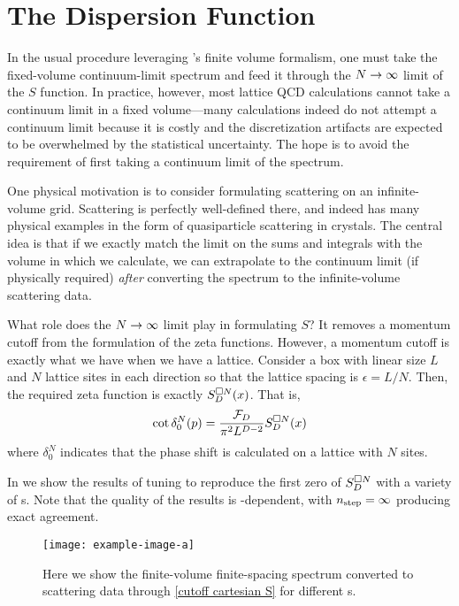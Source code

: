 \section{The Dispersion Function}\label{sec:dispersion}

In the usual procedure leveraging \Luscher's finite volume formalism, one must take the fixed-volume continuum-limit spectrum and feed it through the $N\rightarrow\infty$ limit of the $S$ function.
In practice, however, most lattice QCD calculations cannot take a continuum limit in a fixed volume---many calculations indeed do not attempt a continuum limit because it is costly and the discretization artifacts are expected to be overwhelmed by the statistical uncertainty.
The hope is to avoid the requirement of first taking a continuum limit of the spectrum.

One physical motivation is to consider formulating scattering on an infinite-volume grid.
Scattering is perfectly well-defined there, and indeed has many physical examples in the form of quasiparticle scattering in crystals.
The central idea is that if we exactly match the limit on the sums and integrals with the volume in which we calculate, we can extrapolate to the continuum limit (if physically required) \emph{after} converting the spectrum to the infinite-volume scattering data.

What role does the $N\rightarrow\infty$ limit play in formulating $S$?
It removes a momentum cutoff from the formulation of the zeta functions.
However, a momentum cutoff is exactly what we have when we have a lattice.
Consider a box with linear size $L$ and $N$ lattice sites in each direction so that the lattice spacing is $\epsilon=L/N$.
Then, the required zeta function is exactly $S_D^{\square N}(x)$.  That is,
\begin{equation}\label{eq:cutoff cartesian S}
    \cot \delta_0^N(p) = \frac{\mathcal{F}_D}{\pi^2 L^{D-2}} S_D^{\square N}(x)
\end{equation}
where $\delta_0^N$ indicates that the phase shift is calculated on a lattice with $N$ sites.

In  we show the results of tuning to reproduce the first zero of $S_D^{\square N}$ with a variety of {\nstep}s.
Note that the quality of the results is \nstep-dependent, with ${n_\text{step}}=\infty$ producing exact agreement.

\begin{figure}
    \texttt{[image: example-image-a]}
    \caption{Here we show the finite-volume finite-spacing spectrum converted to scattering data through \eqref{cutoff cartesian S} for different {\nstep}s.
    }
    \label{fig:results cutoff cartesian S}
\end{figure}

